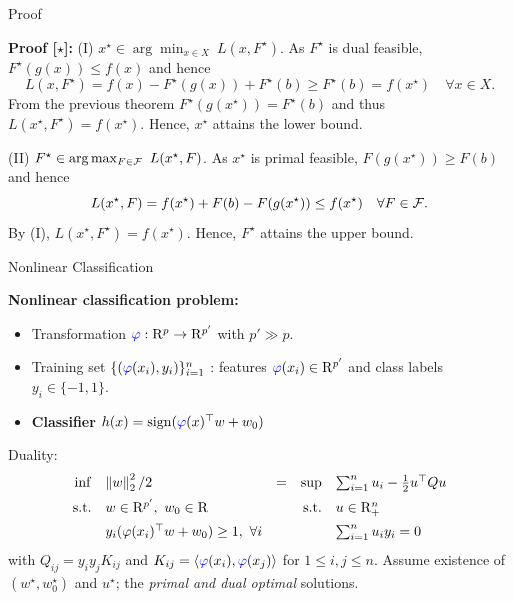 \documentclass[9pt]{beamer}
\begin{document}
\begin{frame}{Proof}

  \textbf{Proof [$\star$]:}
  (I) $x^\star\in \arg\min_{x\in X} ~L(x, F^\star)$. As $F^\star$ is dual feasible, $F^\star(g(x))\leq f(x)$ and hence
  \[
    L(x, F^\star) = f(x) - F^\star(g(x)) + F^\star(b) \geq F^\star(b) = f(x^\star) \quad \forall x\in X.
  \]
  From the previous theorem $F^\star(g(x^\star)) = F^\star(b)$ and thus $L(x^\star, F^\star) = f(x^\star)$. Hence, $x^\star$ attains the lower bound.

  \vfill

  (II) $F^\star \in \arg \max_{F\in \mc F} ~L(x^\star, F)$. As $x^\star$ is primal feasible, $F(g(x^\star))\geq F(b)$ and hence
  \[
    L(x^\star, F) = f(x^\star) + F(b) - F(g(x^\star)) \leq f(x^\star) \quad \forall F\in \mc F.
  \]
  By (I), $L(x^\star, F^\star) = f(x^\star)$. Hence, $F^\star$ attains the upper bound.


\end{frame}

\begin{frame}{Nonlinear Classification}

  \textbf{Nonlinear classification problem:}
  \begin{itemize}
  \item Transformation $\emph{\varphi}:\Re^p\to\Re^{p'}$ with $p'\gg p$.
  \item Training set $\{(\emph{\varphi}(x_i), y_i)\}_{i=1}^n$ : features $\emph{\varphi}(x_i)\in\Re^{p'}$ and class labels $y_i \in \{-1, 1\}$.

  \item \textbf{Classifier $h(x) = \operatorname{sign}(\emph{\varphi}(x)\tpose w + w_0)$}
  \end{itemize}

  \vfill

  Duality:
  \[
    \begin{array}{rlcrl}
      \inf & \norm{w}_2^2/2 & = & \sup & \sum_{i=1}^n u_i - \frac12 u\tpose Q u \\[0.5em]
      \st & w\in\Re^{p'},~w_0\in\Re & & \st & u \in \Re^n_+ \\[0.5em] 
           & y_i(\varphi(x_i)\tpose w + w_0) \geq 1,~ \forall i & & & \sum_{i=1}^n u_i y_i = 0
    \end{array}
  \]
  with $Q_{ij} = y_i y_j K_{ij}$ and $K_{ij}= \iprod{\emph{\varphi}(x_i)}{\emph{\varphi}(x_j)}$ for $1\leq i, j\leq n$. Assume existence of $(w^\star, w_0^\star)$ and $u^\star$; the \emph{primal and dual optimal} solutions.
  
\end{frame}
\end{document}
